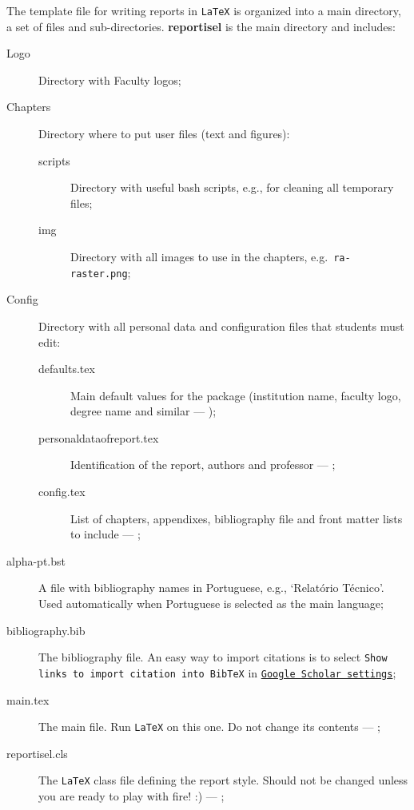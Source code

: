 The template file for writing reports in \texttt{LaTeX} is organized into a main
directory, a set of files and sub-directories. \textbf{reportisel} is the main
directory and includes:
\begin{description}
    \item[Logo] Directory with Faculty logos;
    \item[Chapters] Directory where to put user files (text and figures):
    \begin{description}
        \item[scripts] Directory with useful bash scripts, e.g., for cleaning all temporary files;
        \item[img] Directory with all images to use in the chapters, e.g.\ \texttt{ra-raster.png};
    \end{description}
    \item[Config] Directory with all personal data and configuration files that students must edit:
    \begin{description}
        \item[defaults.tex] Main default values for the package (institution name, faculty logo, degree name and similar ---
        {\color{red}{TO CHANGE BY THE USER}});
        \item[personaldataofreport.tex] Identification of the report, authors and professor ---
        {\color{red}{TO CHANGE BY THE USER}};
        \item[config.tex] List of chapters, appendixes, bibliography file and front matter lists to include ---
        {\color{red}{TO CHANGE BY THE USER}};
    \end{description}
    \item[alpha-pt.bst] A file with bibliography names in Portuguese, e.g., `Relat\'orio T\'ecnico'. Used automatically when Portuguese is selected as the main language;
    \item[bibliography.bib] The bibliography file. An easy way to import citations is to select \texttt{Show links to import citation into BibTeX} in \href{http://scholar.google.pt/scholar_settings?hl=en&as_sdt=0,5}{\texttt{Google Scholar settings}};
    \item[main.tex] The main file. Run \texttt{LaTeX} on this one. Do not change its contents ---
    {\color{red}{DO NOT CHANGE}};
    \item[reportisel.cls] The \texttt{LaTeX} class file defining the report style. Should not be changed unless you are ready to play with fire! :) ---
    {\color{red}{DO NOT CHANGE}};
\end{description}


